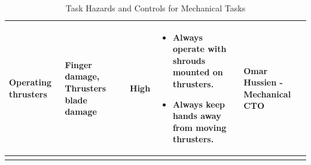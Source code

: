 \documentclass[conference , 12pt]{IEEEtran}
\begin{document}
\begin{longtable}{|p{3.5cm}|>{\raggedright}p{3.5cm}|p{1.5cm}|>{\raggedright}p{5cm}|p{3cm}|}
    \hline
    \textbf{Operating thrusters}                                                          & Finger damage, Thrusters blade damage                                  & High                &
    \begin{itemize}[leftmargin=*]
        \item Always operate with shrouds mounted on thrusters.
        \item Always keep hands away from moving thrusters.
    \end{itemize}                               & Omar Hussien - Mechanical CTO                                                                                                                                                                        \\
    \hline
    \caption{Task Hazards and Controls for Mechanical Tasks}
\end{longtable}

\newpage
\end{document}

